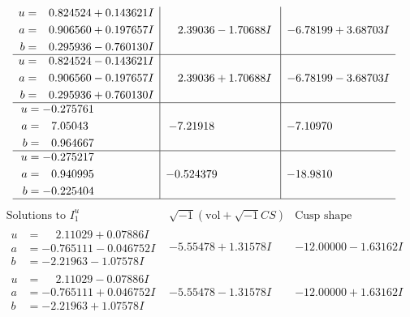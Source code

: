 \documentclass[1p]{elsarticle_modified}
\theoremstyle{definition}
\newcommand{\I}{\sqrt{-1}}
\begin{document}
$$\begin{array}{c|c|c}
\begin{aligned}
u &= \phantom{-}0.824524 + 0.143621 I \\
a &= \phantom{-}0.906560 + 0.197657 I \\
b &= \phantom{-}0.295936 - 0.760130 I\end{aligned}
 & \phantom{-}2.39036 - 1.70688 I & -6.78199 + 3.68703 I \\ \hline\begin{aligned}
u &= \phantom{-}0.824524 - 0.143621 I \\
a &= \phantom{-}0.906560 - 0.197657 I \\
b &= \phantom{-}0.295936 + 0.760130 I\end{aligned}
 & \phantom{-}2.39036 + 1.70688 I & -6.78199 - 3.68703 I \\ \hline\begin{aligned}
u &= -0.275761\phantom{ +0.000000I} \\
a &= \phantom{-}7.05043\phantom{ +0.000000I} \\
b &= \phantom{-}0.964667\phantom{ +0.000000I}\end{aligned}
 & -7.21918\phantom{ +0.000000I} & -7.10970\phantom{ +0.000000I} \\ \hline\begin{aligned}
u &= -0.275217\phantom{ +0.000000I} \\
a &= \phantom{-}0.940995\phantom{ +0.000000I} \\
b &= -0.225404\phantom{ +0.000000I}\end{aligned}
 & -0.524379\phantom{ +0.000000I} & -18.9810\phantom{ +0.000000I}\\
 \hline 
 \end{array}$$\newpage$$\begin{array}{c|c|c}  
\text{Solutions to }I^u_{1}& \I (\text{vol} + \sqrt{-1}CS) & \text{Cusp shape}\\
 \hline 
\begin{aligned}
u &= \phantom{-}2.11029 + 0.07886 I \\
a &= -0.765111 - 0.046752 I \\
b &= -2.21963 - 1.07578 I\end{aligned}
 & -5.55478 + 1.31578 I & -12.00000 - 1.63162 I \\ \hline\begin{aligned}
u &= \phantom{-}2.11029 - 0.07886 I \\
a &= -0.765111 + 0.046752 I \\
b &= -2.21963 + 1.07578 I\end{aligned}
 & -5.55478 - 1.31578 I & -12.00000 + 1.63162 I \\ \hline\begin{aligned}

\end{aligned}
\end{array}$$
\end{document}
